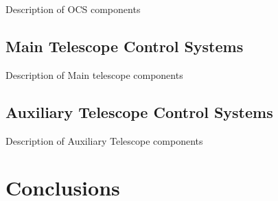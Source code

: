 Description of OCS components

\subsection{Main Telescope Control Systems}\label{sect:mtcs}

Description of Main telescope components

\subsection{Auxiliary Telescope Control Systems}\label{sect:atcs}

Description of Auxiliary Telescope components

\section{Conclusions}\label{sect:conc}

